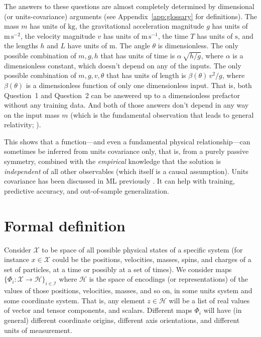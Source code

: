 \documentclass[]{article} %
\renewcommand{\mathcal}[1]{\mathscr{#1}} %
\newcommand{\appref}[1]{Appendix~\ref{#1}}
\newcommand{\unit}[1]{\mathrm{#1}}
\newcommand{\kg}{\unit{kg}}
\newcommand{\m}{\unit{m}}
\newcommand{\s}{\unit{s}}
\begin{document}
The answers to these questions are almost completely determined by dimensional (or units-covariance) arguments (see \appref{app:glossary} for definitions).
The mass $m$ has units of $\kg$, the gravitational acceleration magnitude $g$ has units of $\m\,\s^{-2}$, the velocity magnitude $v$ has units of $\m\,\s^{-1}$, the time $T$ has units of $\s$, and the lengths $h$ and $L$ have units of $\m$.
The angle $\theta$ is dimensionless.
The only possible combination of $m, g, h$ that has units of time is $\alpha\,\sqrt{h/g}$, where $\alpha$ is a dimensionless constant, which doesn't depend on any of the inputs.
The only possible combination of $m, g, v, \theta$ that has units of length is $\beta(\theta)\,v^2/g$, where $\beta(\theta)$ is a dimensionless function of only one dimensionless input.
That is, both Question~1 and Question~2 can be answered up to a dimensionless prefactor without any training data.
And both of those answers don't depend in any way on the input mass $m$ (which is the fundamental observation that leads to general relativity; \citealt{gr}).

This shows that a function---and even a fundamental physical relationship---can sometimes be inferred from units covariance only, that is, from a purely passive symmetry, combined with the \emph{empirical} knowledge that the solution is \emph{independent} of all other observables (which itself is a causal assumption).
Units covariance has been discussed in ML previously \citep{villar2022dimensionless, bakarji2022dimensionally, xie2022data}.
It can help with training, predictive accuracy, and out-of-sample generalization.

\section{Formal definition}\label{sec:definitions}
Consider $\mathcal{X}$ to be space of all possible physical states of a specific system (for instance $x\in \mathcal X$ could be the positions, velocities, masses, spins, and charges of a set of particles, at a time or possibly at a set of times).
We consider maps $\{\Phi_i: \mathcal{X} \to \mathcal{H}\}_{i\in \mathcal{I}}$ where $\mathcal{H}$ is the space of encodings (or representations) of the values of those positions, velocities, masses, and so on, in some units system and some coordinate system.
That is, any element $z\in \mathcal{H}$ will be a list of real values of vector and tensor components, and scalars.
Different maps $\Phi_i$ will have (in general) different coordinate origins, different axis orientations, and different units of measurement.
\end{document}
